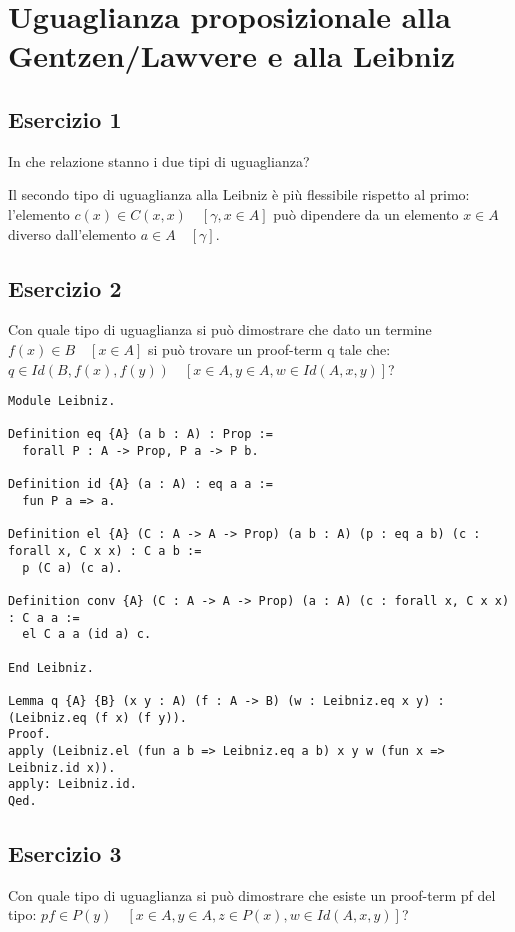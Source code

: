 \newpage
\section{Uguaglianza proposizionale alla Gentzen/Lawvere e alla Leibniz}

\subsection{Esercizio 1}

In che relazione stanno i due tipi di uguaglianza?

Il secondo tipo di uguaglianza alla Leibniz è più flessibile rispetto al primo:
l'elemento $c(x) \in C(x,x) \quad [\gamma, x \in A]$ può dipendere da un elemento
$x \in A$ diverso dall'elemento $a \in A \quad [\gamma]$.

\subsection{Esercizio 2}

Con quale tipo di uguaglianza si può dimostrare che dato un termine
$f(x) \in B \quad [x \in A]$ si può trovare un proof-term q tale che:
$q \in Id(B, f(x), f(y)) \quad [x \in A, y \in A, w \in Id(A,x,y)]$?

\begin{lstlisting}[language=Coq]
Module Leibniz.

Definition eq {A} (a b : A) : Prop :=
  forall P : A -> Prop, P a -> P b.

Definition id {A} (a : A) : eq a a :=
  fun P a => a.

Definition el {A} (C : A -> A -> Prop) (a b : A) (p : eq a b) (c : forall x, C x x) : C a b :=
  p (C a) (c a).

Definition conv {A} (C : A -> A -> Prop) (a : A) (c : forall x, C x x) : C a a :=
  el C a a (id a) c.

End Leibniz.

Lemma q {A} {B} (x y : A) (f : A -> B) (w : Leibniz.eq x y) : (Leibniz.eq (f x) (f y)).
Proof.
apply (Leibniz.el (fun a b => Leibniz.eq a b) x y w (fun x => Leibniz.id x)).
apply: Leibniz.id.
Qed.
\end{lstlisting}

\subsection{Esercizio 3}

Con quale tipo di uguaglianza si può dimostrare che esiste un proof-term pf del
tipo: $pf \in P(y) \quad [x \in A, y \in A, z \in P(x), w \in Id(A,x,y)]$?

